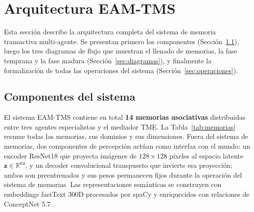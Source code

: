 \section{Arquitectura EAM-TMS}
\label{sec:arquitectura}

Esta sección describe la arquitectura completa del sistema de memoria transactiva
multi-agente.
Se presentan primero los componentes (Sección~\ref{sec:componentes}), luego los tres
diagramas de flujo que muestran el llenado de memorias, la fase temprana y la fase
madura (Sección~\ref{sec:diagramas}), y finalmente la formalización de todas las
operaciones del sistema (Sección~\ref{sec:operaciones}).

\subsection{Componentes del sistema}
\label{sec:componentes}

El sistema EAM-TMS contiene en total \textbf{14 memorias asociativas} distribuidas entre
tres agentes especialistas y el mediador TME.
La Tabla~\ref{tab:memorias} resume todas las memorias, sus dominios y sus dimensiones.
Fuera del sistema de memorias, dos componentes de percepción actúan como interfaz con
el mundo: un encoder ResNet18 \cite{he2016resnet} que proyecta imágenes de $128\times128$
píxeles al espacio latente $\mathbf{z} \in \mathbb{R}^{64}$, y un decoder convolucional
transpuesto que invierte esa proyección; ambos son preentrenados y sus pesos permanecen
fijos durante la operación del sistema de memorias.
Las representaciones semánticas se construyen con embeddings fastText 300D
\cite{bojanowski2017fasttext} procesados por spaCy \cite{honnibal2020spacy} y
enriquecidos con relaciones de ConceptNet 5.7 \cite{speer2017conceptnet}.

